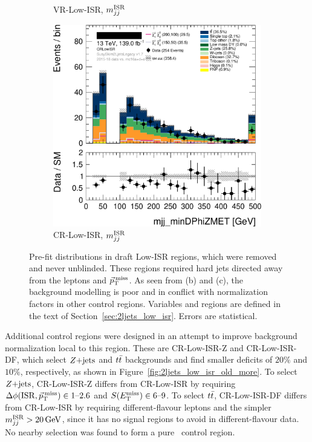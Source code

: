 \begin{figure}[tp]
\begin{subfigure}{0.495\textwidth}
\caption{VR-Low-ISR, $\mwisr$}
\end{subfigure}
\hfill
\begin{subfigure}{0.495\textwidth}
\centering
\includegraphics[width=\textwidth]{figures/2ljets_vrlow_old_crlowisr.png}
\caption{CR-Low-ISR, $\mwisr$}
\end{subfigure}
\caption[
Pre-fit distributions in draft Low-ISR regions, which were removed
]{%
Pre-fit distributions in draft Low-ISR regions, which were removed and never
unblinded.
These regions required hard jets directed away from the leptons and $\ptmiss$.
As seen from (b) and (c), the background modelling is poor and in conflict
with normalization factors in other control regions.
Variables and regions are defined in the text of
Section~\ref{sec:2ljets_low_isr}.
Errors are statistical.
}
\label{fig:2ljets_low_isr_old}
\end{figure}

Additional control regions were designed in an attempt to improve background
normalization local to this region.
These are CR-Low-ISR-Z and CR-Low-ISR-DF, which select $\zjets$ and $\ttbar$
backgrounds and find smaller deficits of $20\%$ and $10\%$, respectively,
as shown in Figure~\ref{fig:2ljets_low_isr_old_more}.
To select $\zjets$, CR-Low-ISR-Z differs from CR-Low-ISR by requiring
$\dphiisrmet \in 1\textrm{--}2.6$ and $\metsig \in 6\textrm{--}9$.
To select $\ttbar$, CR-Low-ISR-DF differs from CR-Low-ISR by requiring
different-flavour leptons and the simpler $\mwisr > 20\,\eV[G]$, since it
has no signal regions to avoid in different-flavour data.
No nearby selection was found to form a pure \diboson\ control region.

